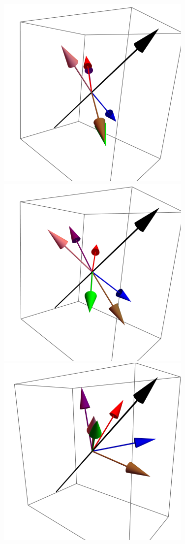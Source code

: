 \documentclass{article}
\begin{document}
\begin{figure}[ht]
\includegraphics[scale=0.22]{HVariedData/Pictures/101Inc116.png}
\includegraphics[scale=0.22]{HVariedData/Pictures/101Inc128.png}
\includegraphics[scale=0.22]{HVariedData/Pictures/101Inc32S.png}

\end{figure}
\end{document}
